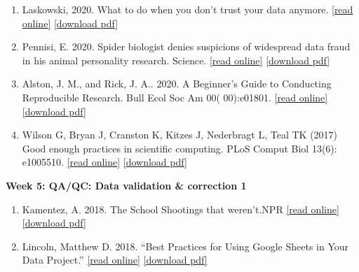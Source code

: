 \documentclass[
  12pt,
]{article}
\begin{document}
\begin{enumerate}
\def\labelenumi{\arabic{enumi}.}
\item
  Laskowski, 2020. What to do when you don't trust your data anymore.
  \href{https://laskowskilab.faculty.ucdavis.edu/2020/01/29/retractions/}{{[}read
  online{]}}
  \href{https://github.com/BrunaLab/LAS6292_DataManagement/blob/master/Assigned_Readings/laskowski_2020.pdf}{{[}download
  pdf{]}}
\item
  Pennisi, E. 2020. Spider biologist denies suspicions of widespread
  data fraud in his animal personality research. Science.
  \href{https://www.sciencemag.org/news/2020/01/spider-biologist-denies-suspicions-widespread-data-fraud-his-animal-personality}{{[}read
  online{]}}
  \href{https://github.com/BrunaLab/LAS6292_DataManagement/blob/master/Assigned_Readings/Pennisi_2020.pdf}{{[}download
  pdf{]}}
\item
  Alston, J. M., and Rick, J. A.. 2020. A Beginner's Guide to Conducting
  Reproducible Research. Bull Ecol Soc Am 00( 00):e01801.
  \href{https://doi.org/10.1002/bes2.1801}{{[}read online{]}}
  \href{https://github.com/BrunaLab/LAS6292_DataManagement/blob/master/Assigned_Readings/Alston_Rick_2021_BullEcolSocAm.pdf}{{[}download
  pdf{]}}
\item
  Wilson G, Bryan J, Cranston K, Kitzes J, Nederbragt L, Teal TK (2017)
  Good enough practices in scientific computing. PLoS Comput Biol 13(6):
  e1005510. \href{https://doi.org/10.1371/journal.pcbi.1005510}{{[}read
  online{]}}
  \href{https://github.com/BrunaLab/LAS6292_DataManagement/blob/master/Assigned_Readings/wilson_etal_2017.pdf}{{[}download
  pdf{]}}
\end{enumerate}

\textbf{Week 5: QA/QC: Data validation \& correction 1}

\begin{enumerate}
\def\labelenumi{\arabic{enumi}.}
\item
  Kamentez, A. 2018. The School Shootings that weren't.NPR
  \href{http://tinyurl.com/y77p3o36}{{[}read online{]}}
  \href{https://github.com/BrunaLab/LAS6292_DataManagement/blob/master/Assigned_Readings/Kamenetz_2018.pdf}{{[}download
  pdf{]}}
\item
  Lincoln, Matthew D. 2018. ``Best Practices for Using Google Sheets in
  Your Data Project.''
  \href{https://matthewlincoln.net/2018/03/26/best-practices-for-using-google-sheets-in-your-data-project.html}{{[}read
  online{]}}
  \href{https://github.com/BrunaLab/LAS6292_DataManagement/blob/master/Assigned_Readings/Lincoln_2018.pdf}{{[}download
  pdf{]}}
\end{enumerate}
\end{document}
